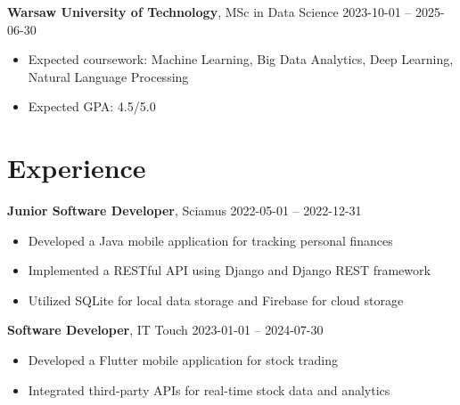 \documentclass[10pt, letterpaper]{article}
\begin{document}
\begin{paracol}{2}
\noindent\textbf{Warsaw University of Technology}, MSc in Data Science \switchcolumn
\hfill 2023-10-01 -- 2025-06-30
\end{paracol}

\vspace{5pt}

\begin{itemize}
    
    \item Expected coursework: Machine Learning, Big Data Analytics, Deep Learning, Natural Language Processing
    
    \item Expected GPA: 4.5/5.0
    
\end{itemize}


\section*{Experience}

\begin{paracol}{2}
\noindent\textbf{Junior Software Developer}, Sciamus \switchcolumn
\hfill 2022-05-01 -- 2022-12-31
\end{paracol}

\vspace{5pt}

\begin{itemize}
    
    \item Developed a Java mobile application for tracking personal finances
    
    \item Implemented a RESTful API using Django and Django REST framework
    
    \item Utilized SQLite for local data storage and Firebase for cloud storage
    
\end{itemize}

\begin{paracol}{2}
\noindent\textbf{Software Developer}, IT Touch \switchcolumn
\hfill 2023-01-01 -- 2024-07-30
\end{paracol}

\vspace{5pt}

\begin{itemize}
    
    \item Developed a Flutter mobile application for stock trading
    
    \item Integrated third-party APIs for real-time stock data and analytics
    
\end{itemize}
\end{document}
